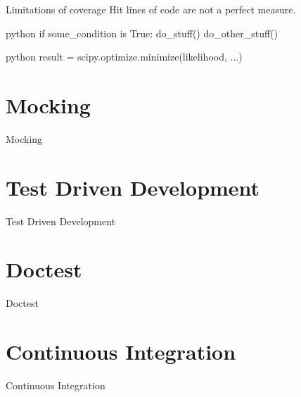\documentclass[
  aspectratio=1610,
]{beamer}
\newcommand\headlineframe[1]{%
  \begin{frame}[c]%
    \begin{center}%
      \Huge\color{vertexDarkRed}#1%
    \end{center}%
  \end{frame}%
}%
\begin{document}
\begin{frame}[c, fragile]{Limitations of coverage}
  Hit lines of code are not a perfect measure.
  \begin{code}{python}
    if some_condition is True:
      do_stuff()
    do_other_stuff()
  \end{code}



  \begin{code}{python}
    result = scipy.optimize.minimize(likelihood, ...)
  \end{code}

\end{frame}

\section{Mocking}
\headlineframe{Mocking}

\section{Test Driven Development}
\headlineframe{Test Driven Development}

\section{Doctest}
\headlineframe{Doctest}

\section{Continuous Integration}
\headlineframe{Continuous Integration}
\end{document}
